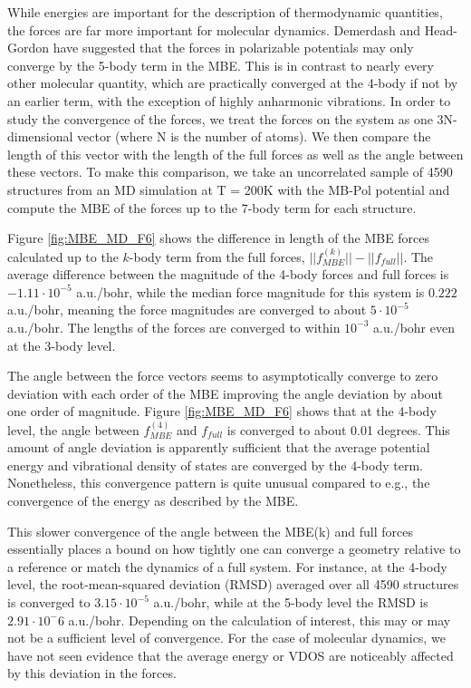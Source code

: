 \documentclass[11pt, proquest]{uwthesis}[2020/02/24]
\let\ce\ch
\begin{document}
\par While energies are important for the description of thermodynamic quantities, the forces are far more important for molecular dynamics. Demerdash and Head-Gordon have suggested that the forces in polarizable potentials may only converge by the 5-body term in the MBE.\autocite{demerdash_assessing_2017} This is in contrast to nearly every other molecular quantity, which are practically converged at the 4-body if not by an earlier term,\autocite{bates_development_2011,medders_many-body_2013,xantheas_cooperativity_2000} with the exception of highly anharmonic vibrations.\autocite{heindel_origin_2018} In order to study the convergence of the forces, we treat the forces on the system as one 3N-dimensional vector (where N is the number of atoms). We then compare the length of this vector with the length of the full forces as well as the angle between these vectors. To make this comparison, we take an uncorrelated sample of 4590 structures from an MD simulation at T = 200K with the MB-Pol potential and compute the MBE of the forces up to the 7-body term for each structure.

\par Figure \ref{fig:MBE_MD_F6} shows the difference in length of the MBE forces calculated up to the $k$-body term from the full forces, $||f^{(k)}_{MBE}||-||f_{full}||$. The average difference between the magnitude of the 4-body forces and full forces is $-1.11\cdot 10^{-5}$ a.u./bohr, while the median force magnitude for this system is $0.222$ a.u./bohr, meaning the force magnitudes are converged to about $5\cdot 10^{-5}$ a.u./bohr. The lengths of the forces are converged to within $10^{-3}$ a.u./bohr even at the 3-body level.

\par The angle between the force vectors seems to asymptotically converge to zero deviation with each order of the MBE improving the angle deviation by about one order of magnitude. Figure \ref{fig:MBE_MD_F6} shows that at the 4-body level, the angle between $f^{(4)}_{MBE}$ and $f_{full}$ is converged to about 0.01 degrees. This amount of angle deviation is apparently sufficient that the average potential energy and vibrational density of states are converged by the 4-body term. Nonetheless, this convergence pattern is quite unusual compared to e.g., the convergence of the energy as described by the MBE.

\par This slower convergence of the angle between the MBE(k) and full forces essentially places a bound on how tightly one can converge a geometry relative to a reference or match the dynamics of a full system. For instance, at the 4-body level, the root-mean-squared deviation (RMSD) averaged over all 4590 \ce{(H2O)_{10}} structures is converged to $3.15\cdot 10^{-5}$ a.u./bohr, while at the 5-body level the RMSD is $2.91\cdot 10^-6$ a.u./bohr. Depending on the calculation of interest, this may or may not be a sufficient level of convergence. For the case of molecular dynamics, we have not seen evidence that the average energy or VDOS are noticeably affected by this deviation in the forces.
\end{document}
